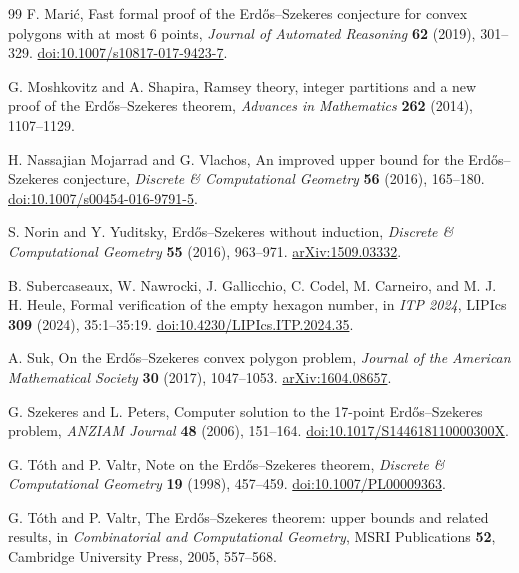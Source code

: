 \begin{thebibliography}{99}
 F. Mari\'c,
Fast formal proof of the Erd\H{o}s--Szekeres conjecture for convex polygons
with at most 6 points, \emph{Journal of Automated Reasoning}
\textbf{62} (2019), 301--329.
\href{https://doi.org/10.1007/s10817-017-9423-7}{doi:10.1007/s10817-017-9423-7}.

 G. Moshkovitz and A. Shapira,
Ramsey theory, integer partitions and a new proof of the
Erd\H{o}s--Szekeres theorem,
\emph{Advances in Mathematics} \textbf{262} (2014), 1107--1129.

 H. Nassajian Mojarrad and G. Vlachos,
An improved upper bound for the Erd\H{o}s--Szekeres conjecture,
\emph{Discrete \& Computational Geometry} \textbf{56} (2016), 165--180.
\href{https://doi.org/10.1007/s00454-016-9791-5}{doi:10.1007/s00454-016-9791-5}.

 S. Norin and Y. Yuditsky,
Erd\H{o}s--Szekeres without induction,
\emph{Discrete \& Computational Geometry} \textbf{55} (2016), 963--971.
\href{https://arxiv.org/abs/1509.03332}{arXiv:1509.03332}.

 B. Subercaseaux, W. Nawrocki, J. Gallicchio,
C. Codel, M. Carneiro, and M. J. H. Heule,
Formal verification of the empty hexagon number,
in \emph{ITP 2024}, LIPIcs \textbf{309} (2024), 35:1--35:19.
\href{https://doi.org/10.4230/LIPIcs.ITP.2024.35}{doi:10.4230/LIPIcs.ITP.2024.35}.

 A. Suk,
On the Erd\H{o}s--Szekeres convex polygon problem,
\emph{Journal of the American Mathematical Society} \textbf{30} (2017), 1047--1053.
\href{https://arxiv.org/abs/1604.08657}{arXiv:1604.08657}.

 G. Szekeres and L. Peters,
Computer solution to the 17-point Erd\H{o}s--Szekeres problem,
\emph{ANZIAM Journal} \textbf{48} (2006), 151--164.
\href{https://doi.org/10.1017/S144618110000300X}{doi:10.1017/S144618110000300X}.

 G. T\'oth and P. Valtr,
Note on the Erd\H{o}s--Szekeres theorem,
\emph{Discrete \& Computational Geometry} \textbf{19} (1998), 457--459.
\href{https://doi.org/10.1007/PL00009363}{doi:10.1007/PL00009363}.

 G. T\'oth and P. Valtr,
The Erd\H{o}s--Szekeres theorem: upper bounds and related results,
in \emph{Combinatorial and Computational Geometry}, MSRI Publications
\textbf{52}, Cambridge University Press, 2005, 557--568.
\end{thebibliography}
